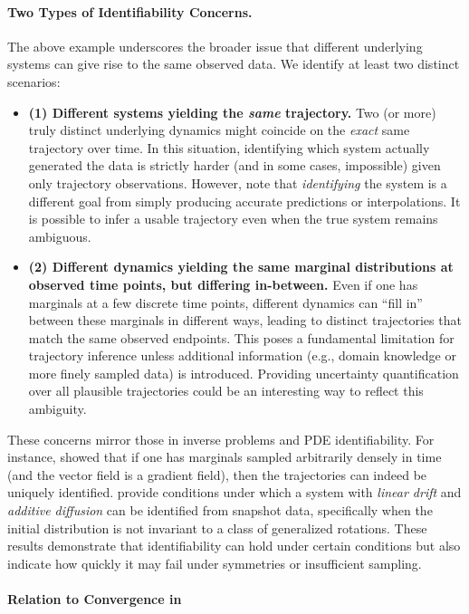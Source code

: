 \paragraph{Two Types of Identifiability Concerns.} The above example underscores the broader issue that different underlying systems can give rise to the same observed data. We identify at least two distinct scenarios:

\begin{itemize}
    \item \textbf{(1) Different systems yielding the \emph{same} trajectory.} Two (or more) truly distinct underlying dynamics might coincide on the \emph{exact} same trajectory over time. In this situation, identifying which system actually generated the data is strictly harder (and in some cases, impossible) given only trajectory observations. However, note that \emph{identifying} the system is a different goal from simply producing accurate predictions or interpolations. It is possible to infer a usable trajectory even when the true system remains ambiguous.
    \item \textbf{(2) Different dynamics yielding the same marginal distributions at observed time points, but differing in-between.}
    Even if one has marginals at a few discrete time points, different dynamics can ``fill in'' between these marginals in different ways, leading to distinct trajectories that match the same observed endpoints. This poses a fundamental limitation for trajectory inference unless additional information (e.g., domain knowledge or more finely sampled data) is introduced. Providing uncertainty quantification over all plausible trajectories could be an interesting way to reflect this ambiguity.
\end{itemize}

These concerns mirror those in inverse problems and PDE identifiability. For instance, \citet{lavenant2024toward} showed that if one has marginals sampled arbitrarily densely in time (and the vector field is a gradient field), then the trajectories can indeed be uniquely identified. \citet{guan2024identifying} provide conditions under which a system with \emph{linear drift} and \emph{additive diffusion} can be identified from snapshot data, specifically when the initial distribution is not invariant to a class of generalized rotations. These results demonstrate that identifiability can hold under certain conditions but also indicate how quickly it may fail under symmetries or insufficient sampling.

\paragraph{Relation to Convergence in }

